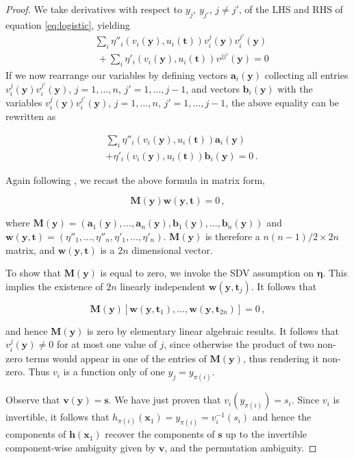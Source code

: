 \documentclass[letterpaper]{article}
\theoremstyle{definition}
\begin{document}
\begin{proof}
We take derivatives with respect to $y_j$, $y_{j'}$, $j \neq j'$,  of the LHS and RHS of equation \ref{eq:logistic}, yielding
\begin{align*}
&\sum_{i} \eta''_{i}(v_{i}(\bm{y}),u_{i}(\bm{t}))v^j_i(\bm{y})v^{j'}_i(\bm{y}) \\
&\ + \sum_{i}\eta'_{i}(v_{i}(\bm{y}), u_{i}(\bm{t}))v^{jj'}(\bm{y})=0
\end{align*}
If we now rearrange our variables by defining vectors $\bm{a}_i(\bm{y})$ collecting all entries $v_i^j(\bm{y})v_i^{j'}(\bm{y})$, $j=1, \ldots, n$, $j'=1, \ldots, j-1$, and vectors $\bm{b}_i(\bm{y})$ with the variables $v_i^j(\bm{y})v_i^{j'}(\bm{y})$, $j=1, \ldots, n$, $j'=1, \ldots, j-1$, the above equality can be rewritten as

\begin{align*}
&\sum_{i} \eta''_{i}(v_{i}(\bm{y}),u_{i}(\bm{t}))\bm{a}_i(\bm{y}) \\
&+ \eta'_{i}(v_{i}(\bm{y}), u_{i}(\bm{t}))\bm{b}_i(\bm{y})=0\,.
\end{align*}

Again following \cite{hyvarinen19a}, we recast the above formula in matrix form,

\begin{equation}
\label{eq:matrixmult}
\bm{M}(\bm{y})\bm{w}(\bm{y}, \bm{t})=0\,,
\end{equation}

where $\bm{M}(\bm{y}) = (\bm{a}_1(\bm{y}), \ldots,  \bm{a}_n(\bm{y}), \bm{b}_1(\bm{y}), \ldots, \bm{b}_n(\bm{y})) $ and $\bm{w}(\bm{y}, \bm{t}) = (\eta''_{1}, \ldots, \eta''_{n}, \eta'_{1}, \ldots,\eta'_{n})$. $\bm{M}(\bm{y})$ is therefore a $n(n-1)/2 \times 2n$ matrix, and $\bm{w}(\bm{y}, \bm{t})$ is a $2n$ dimensional vector.

To show that $\bm{M}(\bm{y})$ is equal to zero, we invoke the SDV assumption on $\bm{\eta}$.
This implies the existence of $2n$ linearly independent $\bm{w}(\bm{y}, \bm{t}_j)$.
It follows that

\[
\bm{M}(\bm{y})[\bm{w}(\bm{y}, \bm{t}_1), \ldots, \bm{w}(\bm{y}, \bm{t}_{2n})]=0\,,
\]

and hence $\bm{M}(\bm{y})$ is zero by elementary linear algebraic results.
It follows that $v_i^j(\bm{y})\not=0$ for at most one value of $j$, since otherwise the product of two non-zero terms would appear in one of the entries of $\bm{M}(\bm{y})$, thus rendering it non-zero.
Thus $v_i$ is a function only of one $y_j = y_{\pi(i)}$.

Observe that $\bm{v}(\bm{y}) = \bm{s}$.
We have just proven that $v_i(y_{\pi(i)}) = s_i$.
Since $v_i$ is invertible, it follows that $h_{\pi(i)}(\bm{x}_{1}) = y_{\pi(i)} = v_i^{-1}(s_i)$ and hence the components of $\bm{h}(\bm{x}_{1})$ recover the components of $\bm{s}$ up to the invertible component-wise ambiguity given by $\bm{v}$, and the permutation ambiguity.


\end{proof}
\end{document}
